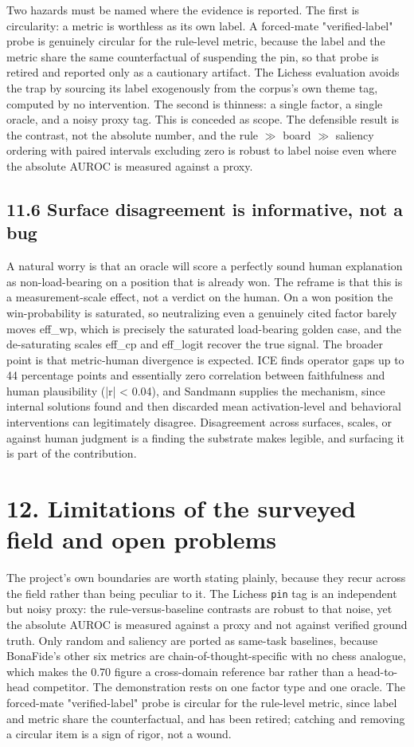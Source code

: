 \documentclass[conference]{IEEEtran}
\begin{document}
Two hazards must be named where the evidence is reported. The first is circularity: a metric is worthless as its own label. A forced-mate "verified-label" probe is genuinely circular for the rule-level metric, because the label and the metric share the same counterfactual of suspending the pin, so that probe is retired and reported only as a cautionary artifact. The Lichess evaluation avoids the trap by sourcing its label exogenously from the corpus's own theme tag, computed by no intervention. The second is thinness: a single factor, a single oracle, and a noisy proxy tag. This is conceded as scope. The defensible result is the contrast, not the absolute number, and the rule $\gg$ board $\gg$ saliency ordering with paired intervals excluding zero is robust to label noise even where the absolute AUROC is measured against a proxy.

\subsection*{11.6 Surface disagreement is informative, not a bug}
A natural worry is that an oracle will score a perfectly sound human explanation as non-load-bearing on a position that is already won. The reframe is that this is a measurement-scale effect, not a verdict on the human. On a won position the win-probability is saturated, so neutralizing even a genuinely cited factor barely moves eff\_wp, which is precisely the saturated load-bearing golden case, and the de-saturating scales eff\_cp and eff\_logit recover the true signal. The broader point is that metric-human divergence is expected. ICE \cite{ref17} finds operator gaps up to 44 percentage points and essentially zero correlation between faithfulness and human plausibility (|r| < 0.04), and Sandmann \cite{ref5} supplies the mechanism, since internal solutions found and then discarded mean activation-level and behavioral interventions can legitimately disagree. Disagreement across surfaces, scales, or against human judgment is a finding the substrate makes legible, and surfacing it is part of the contribution.

\section*{12. Limitations of the surveyed field and open problems}
The project's own boundaries are worth stating plainly, because they recur across the field rather than being peculiar to it. The Lichess \texttt{pin} tag is an independent but noisy proxy: the rule-versus-baseline contrasts are robust to that noise, yet the absolute AUROC is measured against a proxy and not against verified ground truth. Only random and saliency are ported as same-task baselines, because BonaFide's other six metrics \cite{ref14} are chain-of-thought-specific with no chess analogue, which makes the 0.70 figure a cross-domain reference bar rather than a head-to-head competitor. The demonstration rests on one factor type and one oracle. The forced-mate "verified-label" probe is circular for the rule-level metric, since label and metric share the counterfactual, and has been retired; catching and removing a circular item is a sign of rigor, not a wound.
\end{document}
